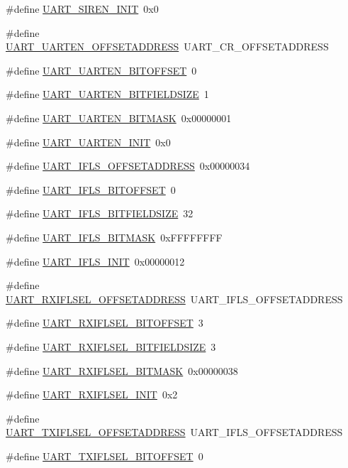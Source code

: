 \begin{DoxyCompactItemize}
\item 
\#define \hyperlink{a00575_a76f9f18037c7a237887fddb1579e6a7b}{UART\_\-SIREN\_\-INIT}~0x0
\item 
\#define \hyperlink{a00575_a9693494faefa3c03e6560d2403b0a44c}{UART\_\-UARTEN\_\-OFFSETADDRESS}~UART\_\-CR\_\-OFFSETADDRESS
\item 
\#define \hyperlink{a00575_a8d5076ebc577d12d7d2e13c1c558d4f2}{UART\_\-UARTEN\_\-BITOFFSET}~0
\item 
\#define \hyperlink{a00575_ae0483dc5c6a23d0377094e1a6d942a6f}{UART\_\-UARTEN\_\-BITFIELDSIZE}~1
\item 
\#define \hyperlink{a00575_a9f93dee52d563740aa01c56f1ca02c99}{UART\_\-UARTEN\_\-BITMASK}~0x00000001
\item 
\#define \hyperlink{a00575_afed1655d9c6ad3512c1284134d091d3e}{UART\_\-UARTEN\_\-INIT}~0x0
\item 
\#define \hyperlink{a00575_aa6911e23d3a4461ec8e372e1e00c3764}{UART\_\-IFLS\_\-OFFSETADDRESS}~0x00000034
\item 
\#define \hyperlink{a00575_afcd21af70825fe0850d7987c64d6913f}{UART\_\-IFLS\_\-BITOFFSET}~0
\item 
\#define \hyperlink{a00575_ab8acbec8c619d8193bf9865056fce7ab}{UART\_\-IFLS\_\-BITFIELDSIZE}~32
\item 
\#define \hyperlink{a00575_a6dca0ae60e84ad1f6cfc427ce71259db}{UART\_\-IFLS\_\-BITMASK}~0xFFFFFFFF
\item 
\#define \hyperlink{a00575_aa4ea3225fc73db61ce13473d8a04ff9f}{UART\_\-IFLS\_\-INIT}~0x00000012
\item 
\#define \hyperlink{a00575_a689705ba0a5d62d9d57cde9a42467899}{UART\_\-RXIFLSEL\_\-OFFSETADDRESS}~UART\_\-IFLS\_\-OFFSETADDRESS
\item 
\#define \hyperlink{a00575_ad61e0394aaac9b315bd9090c46e1bcdd}{UART\_\-RXIFLSEL\_\-BITOFFSET}~3
\item 
\#define \hyperlink{a00575_adfeab1ffc3e4dcdf19094abe7db25144}{UART\_\-RXIFLSEL\_\-BITFIELDSIZE}~3
\item 
\#define \hyperlink{a00575_ac83c9234bdad69bfa8712761d43f2bb1}{UART\_\-RXIFLSEL\_\-BITMASK}~0x00000038
\item 
\#define \hyperlink{a00575_a411e2296e4cea5901945dbd306bd7675}{UART\_\-RXIFLSEL\_\-INIT}~0x2
\item 
\#define \hyperlink{a00575_ad7efbc8feff6205fc912cb05116cd045}{UART\_\-TXIFLSEL\_\-OFFSETADDRESS}~UART\_\-IFLS\_\-OFFSETADDRESS
\item 
\#define \hyperlink{a00575_a6ad19e7159164f4e561a1ff3af25426d}{UART\_\-TXIFLSEL\_\-BITOFFSET}~0

\end{DoxyCompactItemize}
